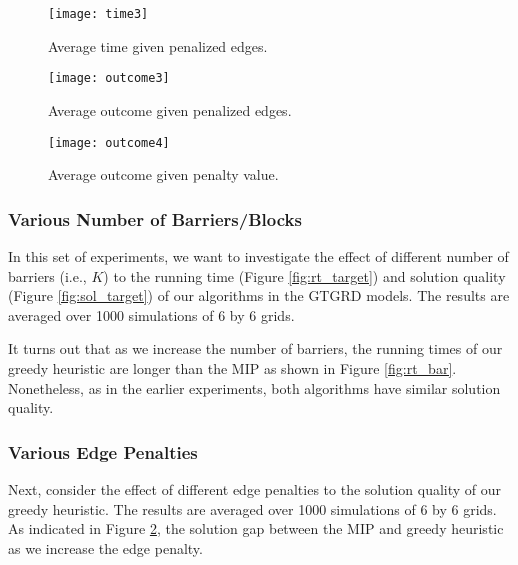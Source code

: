 \begin{figure}[!ht]
\begin{center}
\begin{minipage}{0.48\linewidth}
\texttt{[image: time3]}
\caption{Average time given penalized edges.}
\label{fig:rt_bar}
\end{minipage}%
\hfill
\begin{minipage}{0.49\linewidth}
\texttt{[image: outcome3]}
\caption{Average outcome given penalized edges.}
\label{fig:sol_bar}
\end{minipage}
\end{center}
\end{figure}

\begin{figure}[!ht]
\begin{center}	
\texttt{[image: outcome4]}
\caption{Average outcome given penalty value.}
\label{fig:sol_ep}
\end{center}
\end{figure}

\subsubsection{Various Number of Barriers/Blocks}
In this set of experiments, we want to investigate 
the effect of different number of barriers (i.e., $K$) 
to the running time (Figure \ref{fig:rt_target}) 
and solution quality (Figure \ref{fig:sol_target}) of our algorithms 
in the GTGRD models.  
The results are averaged over 1000 simulations of 6 by 6 grids. 


It turns out that as we increase the number of barriers, 
the running times of our greedy heuristic are longer than 
the MIP as shown in Figure \ref{fig:rt_bar}. 
Nonetheless, as in the earlier experiments, 
both algorithms have similar solution quality. 


\subsubsection{Various Edge Penalties}
Next, consider the effect of different edge penalties 
to the solution quality of our greedy heuristic. 
The results are averaged over 1000 simulations of 6 by 6 grids. 
As indicated in Figure \ref{fig:sol_ep}, 
the solution gap between the MIP and greedy heuristic 
as we increase the edge penalty. 

